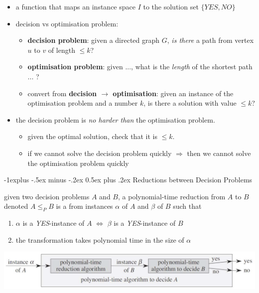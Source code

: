 \documentclass[10pt, landscape]{article}
\makeatletter
\renewcommand{\subsection}{\@startsection{subsection}{2}{0mm}%
  {-1explus -.5ex minus -.2ex}%
  {0.5ex plus .2ex}%
{\normalfont\normalsize\bfseries}}
\makeatother
\begin{document}
\begin{multicols*}{4}
  \begin{itemize}
    \item {} a function that maps an instance space $I$ to the solution set $\{YES, NO\}$
    \item decision vs optimisation problem:
      \begin{itemize}
        \item \textbf{decision problem}: given a directed graph $G$, \textit{is there} a path from vertex $u$ to $v$ of length $\leq k$?
        \item \textbf{optimisation problem}: given ..., what is the \textit{length} of the shortest path ... ?
        \item convert from \textbf{decision $\rightarrow$ optimisation}: given an instance of the optimisation problem and a number $k$, is there a solution with value $\leq k$?
      \end{itemize}
    \item the decision problem is \textit{no harder than} the optimisation problem.
      \begin{itemize}
        \item given the optimal solution, check that it is $\leq k$.
        \item if we cannot solve the decision problem quickly $\Rightarrow$ then we cannot solve the optimisation problem quickly
      \end{itemize}
  \end{itemize}

  \subsection{Reductions between Decision Problems}

  given two decision problems $A$ and $B$, a polynomial-time reduction from $A$ to $B$ denoted $A \leq_P B$ is a  from instances $\alpha$ of $A$ and $\beta$ of $B$ such that
  \begin{enumerate}
    \item $\alpha$ is a \textit{YES}-instance of $A$ $\iff$ $\beta$ is a \textit{YES}-instance of $B$
    \item the transformation takes polynomial time in the size of $\alpha$
  \end{enumerate}

  \begin{tightcenter}
    \includegraphics[width=0.95\linewidth]{cs3230-reductions-decision-problems.png} 
  \end{tightcenter}


\end{multicols*}
\end{document}

